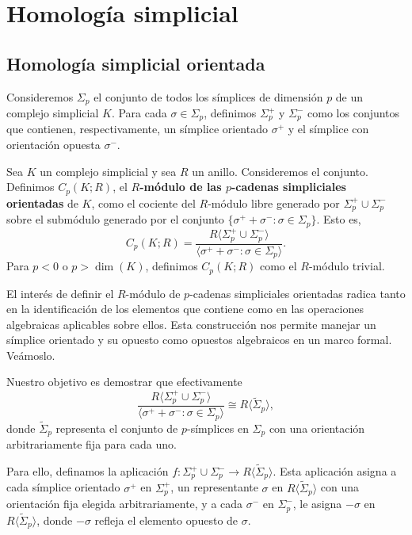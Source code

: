 
\chapter{Homología simplicial}

\section{Homología simplicial orientada}
Consideremos \(\Sigma_{p}\) el conjunto de todos los símplices de dimensión \(p\) de
un complejo simplicial \(K\). Para cada \(\sigma \in \Sigma_{p}\), definimos \(\Sigma_{p}
^{+}\) y \(\Sigma_{p}^{-}\) como los conjuntos que contienen, respectivamente, un símplice
orientado \(\sigma^{+}\) y el símplice con orientación opuesta \(\sigma^{-}\).
\begin{definicion}
	Sea \(K\) un complejo simplicial y sea \(R\) un anillo. Consideremos el conjunto. Definimos
	\(C_{p}(K;R)\), el \textbf{\(R\)-módulo de las \(p\)-cadenas simpliciales orientadas}
	de \(K\), como el cociente del \(R\)-módulo libre generado por
	\(\Sigma_{p}^{+} \cup \Sigma_{p}^{-}\) sobre el submódulo generado por el
	conjunto \(\{\sigma^{+} + \sigma^{-} : \sigma \in \Sigma_{p}\}\). Esto es,
	\[
		C_{p}(K;R) = \frac{R\langle \Sigma_{p}^{+} \cup \Sigma_{p}^{-} \rangle}{\langle
		\sigma^{+} + \sigma^{-} : \sigma \in \Sigma_{p} \rangle}.
	\]
	Para \(p < 0\) o \(p > \dim(K)\), definimos \(C_{p}(K;R)\) como el \(R\)-módulo trivial.
\end{definicion}
El interés de definir el \(R\)-módulo de \(p\)-cadenas simpliciales orientadas
radica tanto en la identificación de los elementos que contiene como en las
operaciones algebraicas aplicables sobre ellos. Esta construcción nos permite manejar
un símplice orientado y su opuesto como opuestos algebraicos en un marco formal.
Veámoslo.

Nuestro objetivo es demostrar que efectivamente
\[
	\frac{R\langle \Sigma_{p}^{+} \cup \Sigma_{p}^{-} \rangle}{\langle \sigma^{+} +
	\sigma^{-} : \sigma \in \Sigma_{p} \rangle}\cong R \langle \tilde{\Sigma}_{p} \rangle
	,
\]
donde \(\tilde{\Sigma}_{p}\) representa el conjunto de \(p\)-símplices en
\(\Sigma_{p}\) con una orientación arbitrariamente fija para cada uno.

Para ello, definamos la aplicación \(f : \Sigma^{+}_{p} \cup \Sigma^{-}_{p} \to R
\langle \tilde{\Sigma}_{p} \rangle\). Esta aplicación asigna a cada símplice
orientado \(\sigma^{+}\) en \(\Sigma_{p}^{+}\), un representante \(\sigma\) en \(R \langle
\tilde{\Sigma}_{p} \rangle\) con una orientación fija elegida arbitrariamente, y
a cada \(\sigma^{-}\) en \(\Sigma_{p}^{-}\), le asigna \(-\sigma\) en \(R \langle 
\tilde{\Sigma}_{p} \rangle\), donde \(-\sigma\) refleja el elemento opuesto de \(\sigma\).

